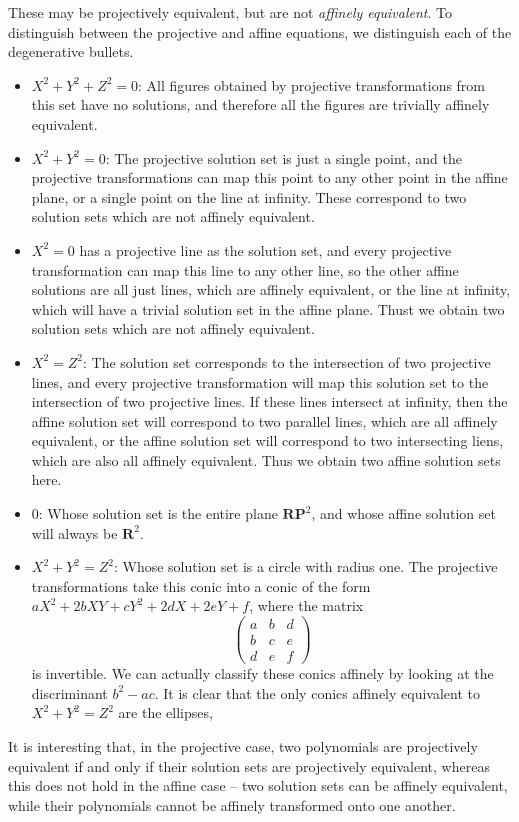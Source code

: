 These may be projectively equivalent, but are not {\it affinely equivalent}. To distinguish between the projective and affine equations, we distinguish each of the degenerative bullets.
%
\begin{itemize}
    \item $X^2 + Y^2 + Z^2 = 0$: All figures obtained by projective transformations from this set have no solutions, and therefore all the figures are trivially affinely equivalent.
    \item $X^2 + Y^2 = 0$: The projective solution set is just a single point, and the projective transformations can map this point to any other point in the affine plane, or a single point on the line at infinity. These correspond to two solution sets which are not affinely equivalent.
    \item $X^2 = 0$ has a projective line as the solution set, and every projective transformation can map this line to any other line, so the other affine solutions are all just lines, which are affinely equivalent, or the line at infinity, which will have a trivial solution set in the affine plane. Thust we obtain two solution sets which are not affinely equivalent.
    \item $X^2 = Z^2$: The solution set corresponds to the intersection of two projective lines, and every projective transformation will map this solution set to the intersection of two projective lines. If these lines intersect at infinity, then the affine solution set will correspond to two parallel lines, which are all affinely equivalent, or the affine solution set will correspond to two intersecting liens, which are also all affinely equivalent. Thus we obtain two affine solution sets here.
    \item $0$: Whose solution set is the entire plane $\mathbf{RP}^2$, and whose affine solution set will always be $\mathbf{R}^2$.
    \item $X^2 + Y^2 = Z^2$: Whose solution set is a circle with radius one. The projective transformations take this conic into a conic of the form $aX^2 + 2bXY + cY^2 + 2dX + 2eY + f$, where the matrix
    \[ \begin{pmatrix} a & b & d \\ b & c & e \\ d & e & f \end{pmatrix} \]
    is invertible. We can actually classify these conics affinely by looking at the discriminant $b^2 - ac$. It is clear that the only conics affinely equivalent to $X^2 + Y^2 = Z^2$ are the ellipses,
\end{itemize}
%
It is interesting that, in the projective case, two polynomials are projectively equivalent if and only if their solution sets are projectively equivalent, whereas this does not hold in the affine case -- two solution sets can be affinely equivalent, while their polynomials cannot be affinely transformed onto one another.


